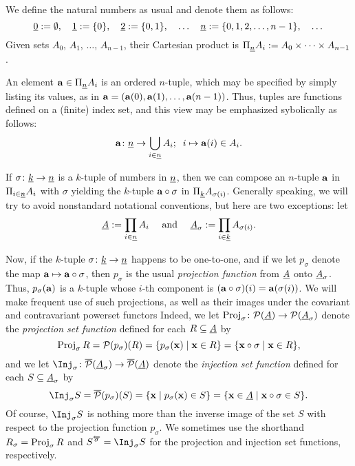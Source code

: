 We define the natural numbers as usual and denote them as follows:
\[
\uzero := \emptyset, \quad
\uone := \{0\}, \quad
\utwo := \{0, 1\}, %
\quad \dots \quad \nn := \{0, 1, 2, \dots, n-1\}, \quad\dots
\]
Given sets $A_0$, $A_1$, $\dots$, $A_{n-1}$, their Cartesian product is
$\myprod_{\nn} A_i := A_0 \times %
\cdots \times A_{n-1}$.

An element
$\mathbf{a} \in \Pi_{\underline{n}} A_i$ is an ordered $n$-tuple, which may be specified by
simply listing its values, 
as in $\mathbf{a} = (\mathbf{a}(0), \mathbf{a}(1), \dots, \mathbf{a}(n-1))$.
Thus, tuples are functions defined on a (finite) index set, and
this view may be emphasized sybolically as follows:
\[
\mathbf{a} \colon \underline{n} \to \bigcup_{i\in \underline{n}} A_i; \;\; i\mapsto \mathbf{a}(i) \in A_i.
\]

If $\sigma\colon \underline{k} \to \underline{n}$ is a $k$-tuple of numbers in 
$\underline{n}$, then we can compose an $n$-tuple $\mathbf{a}$ in $\Pi_{i\in \underline{n}} A_i$
with $\sigma$ yielding the $k$-tuple $\mathbf{a}\circ \sigma$ in 
$\Pi_{\underline{k}}A_{\sigma(i)}$.
Generally speaking, we will try to avoid nonstandard notational conventions, 
but here are two exceptions: let
\[
\underline{A} := \prod_{i\in \underline{n}} A_i \quad \text{ and } \quad \underline{A}_{\sigma} := \prod_{i\in \underline{k}} A_{\sigma(i)}.
\]

Now, if the $k$-tuple $\sigma\colon \underline{k} \to \underline{n}$ happens to be one-to-one,
and if we let $p_\sigma$ denote the map $\mathbf{a} \mapsto \mathbf{a}\circ \sigma$, then $p_\sigma$
is the usual \emph{projection function} from $\underline{A}$ onto $\underline{A}_{\sigma}$.
Thus, $p_{\sigma}(\mathbf{a})$ is a $k$-tuple whose $i$-th component is 
$(\mathbf{a}\circ \sigma)(i) = \mathbf{a}(\sigma(i))$.
We will make frequent use of such projections, as well as
their images under the covariant and contravariant powerset functors
Indeed, we let
$\operatorname{Proj}_\sigma\colon \mathcal{P}(\underline{A}) \to \mathcal{P}(\underline{A}_\sigma)$
denote the \emph{projection set function} defined 
for each $R \subseteq \underline{A}$ by
\[
\operatorname{Proj}_\sigma R = \mathcal{P}(p_\sigma)(R) = \{p_\sigma(\mathbf{x}) \mid \mathbf{x} \in R\} = 
\{\mathbf{x}\circ \sigma \mid \mathbf{x} \in R\},
\]
and we let
$\Inj_\sigma\colon \overline{\sP}(\uA_\sigma) \to \overline{\sP}(\uA)$
denote the \emph{injection set function} defined for each
$S\subseteq \underline{A}_\sigma$ by
\begin{equation}\label{eq:19}
  \Inj_\sigma S = \overline{\sP}(p_\sigma)(S) = \{\bx \mid p_\sigma(\bx) \in S\}
   = \{\bx \in \uA \mid \bx\circ \sigma \in S\}.
\end{equation}
Of course, $\Inj_\sigma S$ is nothing more than the inverse image of the set $S$ with respect to the
projection function $p_\sigma$.
We sometimes use the shorthand $R_\sigma = \operatorname{Proj}_\sigma R$ and
$S^{\overleftarrow{\sigma}} = \Inj_\sigma S$ for the projection and injection set functions, respectively.

